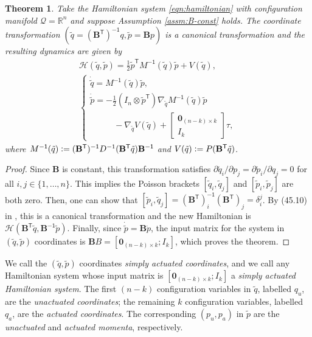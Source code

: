 \documentclass[journal,twoside,web, twocolumn,draftcls]{ieeecolor}
\newtheorem{thm}{Theorem}%
\newcommand*{\tpose}{^\mathsf{T}}
\newcommand*{\inv}{^\mathsf{-1}}
\newcommand*{\R}{\mathbb{R}}
\newcommand*{\Minv}{M^\mathsf{-1}}
\newcommand*{\Id}[1]{I_{#1}}
\newcommand*{\Zmat}[1]{\bm{0}_{#1}}
\newcommand*{\simpleB}{\begin{bmatrix}\Zmat{(n-k)\times k}\\ \Id{k}\end{bmatrix}}
\newcommand*{\eqdef}{\vcentcolon=}
\begin{document}
\begin{thm}\label{thm:simply-actuated}
    Take the Hamiltonian system \eqref{eqn:hamiltonian} with configuration
    manifold \(\mathcal{Q} = \R^n\) and suppose
    Assumption \ref{assm:B-const} holds.
    The coordinate transformation
    \(\left(\tilde{q} = (\mathbf{B}\tpose)\inv q, \tilde{p} = \mathbf{B}p\right)\)
    is a canonical transformation and the resulting dynamics are given by 
    \begin{gather}\label{eqn:simple-hamiltonian}
        \mathcal{H}(\tilde{q},\tilde{p}) = 
        \frac{1}{2} \tilde{p}\tpose \Minv(\tilde{q}) \tilde{p} + V(\tilde{q})
        , \\
       \begin{cases}
           \dot{\tilde{q}} = \Minv(\tilde{q})\tilde{p}
           , \\
           \dot{\tilde{p}} = -\frac{1}{2} (\Id{n} \otimes \tilde{p}\tpose)
           \nabla_{\tilde{q}} \Minv(\tilde{q}) \tilde{p} \\
           \phantom{---} - \nabla_{\tilde{q}} V(\tilde{q}) + \simpleB \tau
            ,
        \end{cases} \nonumber
    \end{gather}
    where 
    \(\Minv(\tilde{q}) \eqdef 
    (\mathbf{B}\tpose)\inv D^{-1}(\mathbf{B}\tpose \tilde{q})\mathbf{B}\inv\)
    and
    \(V(\tilde{q}) \eqdef P(\mathbf{B}\tpose \tilde{q})\).
\end{thm}
\begin{proof}
    Since \(\mathbf{B}\) is constant, this transformation satisfies
    \(\partial\tilde{q}_i/\partial p_j = \partial\tilde{p}_i/\partial q_j = 0\) for all 
    \(i,j \in \{1,\ldots,n\}\).
    This implies the Poisson brackets \([\tilde{q}_i, \tilde{q}_j]\)
    and \([\tilde{p}_i,\tilde{p}_j]\) are both zero.
    Then, one can show that
    \([\tilde{p}_i, \tilde{q}_j] = (\mathbf{B}\tpose)\inv_i (\mathbf{B}\tpose)_j
        = \delta_i^j\).
    By (45.10) in \cite{landau_mechanics}, this is a canonical transformation
    and the new Hamiltonian is
    \(\mathcal{H}(\mathbf{B}\tpose \tilde{q}, \mathbf{B}\inv \tilde{p})\).
    Finally, since \(\dot{\tilde{p}} = \mathbf{B} \dot{p}\), the input
    matrix for the system in \((\tilde{q},\tilde{p})\) coordinates is
    \(\mathbf{B}B = [\Zmat{(n-k)\times k}; \Id{k}]\), which proves the theorem.
\end{proof}

We call the \((\tilde{q},\tilde{p})\) coordinates
\textit{simply actuated coordinates}, and we call any Hamiltonian system
whose input matrix is \([\Zmat{(n-k)\times k}; \Id{k}]\) a 
\textit{simply actuated Hamiltonian system}.
The first \((n-k)\) configuration variables in \(\tilde{q}\), labelled \(q_u\),
are the \textit{unactuated coordinates}; 
the remaining \(k\) configuration variables, labelled \(q_a\), are the
\textit{actuated coordinates}.
The corresponding \((p_u, p_a)\) in \(\tilde{p}\) are the \textit{unactuated}
and \textit{actuated momenta}, respectively.
\end{document}
